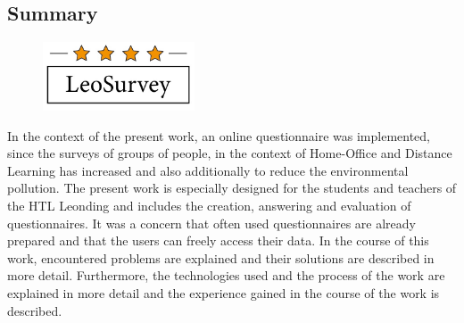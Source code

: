 \begin{spacing}{1}
    \chapter*{Summary}
\end{spacing}
\begin{figure}
    \begin{center}
      \includegraphics[width=0.4\textwidth]{pics/Logo.jpeg}
    \end{center}
\end{figure}
In the context of the present work, an online questionnaire was implemented, since the surveys of groups of people, 
in the context of Home-Office and Distance Learning has increased and also additionally to reduce the environmental pollution. 
\newline
The present work is especially designed for the students and teachers of the HTL Leonding and includes 
the creation, answering and evaluation of questionnaires. It was a concern that 
often used questionnaires are already prepared and that the users can freely access their data.
\newline
\newline
In the course of this work, encountered problems are explained and their solutions are described in more detail. 
Furthermore, the technologies used and the process of the work are explained in more detail and the experience gained 
in the course of the work is described.